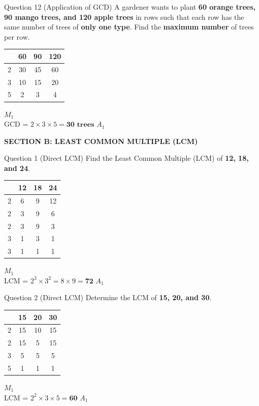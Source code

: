 \documentclass[12pt, a4paper, oneside]{article}
\begin{document}
\begin{solvingbox}{Question 12 (Application of GCD)}
A gardener wants to plant \textbf{60 orange trees, 90 mango trees, and 120 apple trees} in rows such that each row has the same number of trees of \textbf{only one type}. Find the \textbf{maximum number} of trees per row. \\
\begin{tabular}{|c|c|c|c|} \hline
    & \textbf{60} & \textbf{90} & \textbf{120} \\ \hline
    2 & 30 & 45 & 60 \\ \hline
    3 & 10 & 15 & 20 \\ \hline
    5 & 2 & 3 & 4 \\ \hline
\end{tabular} \hfill $M_1$ \\
GCD = $2 \times 3 \times 5 = \mathbf{30\text{ trees}}$ \hfill $A_1$
\end{solvingbox}

\begin{center}
    \textbf{\color{strandcolor} SECTION B: LEAST COMMON MULTIPLE (LCM)}
\end{center}

\begin{solvingbox}{Question 1 (Direct LCM)}
Find the Least Common Multiple (LCM) of \textbf{12, 18, and 24}. \\
\begin{tabular}{|c|c|c|c|} \hline
    & \textbf{12} & \textbf{18} & \textbf{24} \\ \hline
    2 & 6 & 9 & 12 \\ \hline
    2 & 3 & 9 & 6 \\ \hline
    2 & 3 & 9 & 3 \\ \hline
    3 & 1 & 3 & 1 \\ \hline
    3 & 1 & 1 & 1 \\ \hline
\end{tabular} \hfill $M_1$ \\
LCM = $2^3 \times 3^2 = 8 \times 9 = \mathbf{72}$ \hfill $A_1$
\end{solvingbox}

\begin{solvingbox}{Question 2 (Direct LCM)}
Determine the LCM of \textbf{15, 20, and 30}. \\
\begin{tabular}{|c|c|c|c|} \hline
    & \textbf{15} & \textbf{20} & \textbf{30} \\ \hline
    2 & 15 & 10 & 15 \\ \hline
    2 & 15 & 5 & 15 \\ \hline
    3 & 5 & 5 & 5 \\ \hline
    5 & 1 & 1 & 1 \\ \hline
\end{tabular} \hfill $M_1$ \\
LCM = $2^2 \times 3 \times 5 = \mathbf{60}$ \hfill $A_1$
\end{solvingbox}
\end{document}
